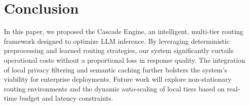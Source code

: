 \section{Conclusion}

In this paper, we proposed the Cascade Engine, an intelligent, multi-tier routing framework designed to optimize LLM inference. By leveraging deterministic preprocessing and learned routing strategies, our system significantly curtails operational costs without a proportional loss in response quality. The integration of local privacy filtering and semantic caching further bolsters the system's viability for enterprise deployments. Future work will explore non-stationary routing environments and the dynamic auto-scaling of local tiers based on real-time budget and latency constraints.
